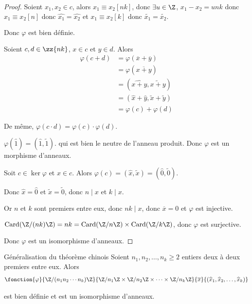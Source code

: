 \begin{proof}
    Soient $x_1, x_2 \in c$, alors $x_1 \equiv x_2 [nk]$, donc $\exists u \in \Z$, 
    $x_1 - x_2 = unk$ donc $x_1 \equiv x_2 [n]$ donc $\widehat{x_1} = \widehat{x_2}$ 
    et $x_1 \equiv x_2 [k]$ donc $\widetilde{x_1} = \widetilde{x_2}$.

    Donc $\varphi$ est bien définie.

    \avspace Soient $c, d \in \zz {nk}$, $x \in c$ et $y \in d$. Alors 
    \begin{align*}
        \varphi(c + d) & = \varphi(\overline x + \overline y) \\
        & = \varphi(\overline{x + y}) \\
        & = (\widehat{x + y}, \widetilde{x + y}) \\
        & = (\widehat x + \widehat y, \widetilde x + \widetilde y) \\
        & = \varphi(c) + \varphi(d)
    \end{align*}

    De même, $\varphi(c \cdot d) = \varphi(c) \cdot \varphi(d)$.

    $\varphi(\widehat 1) = (\widehat 1, \widetilde 1)$. qui est bien le neutre de l'anneau 
    produit. Donc $\varphi$ est un morphisme d'anneaux.

    \lvspace Soit $c \in \ker \varphi$ et $x \in c$. 
    Alors $\varphi(c) = (\widehat x, \widetilde x) = (\widehat 0, \widetilde 0)$.

    Donc $\widehat x = \widehat 0$ et $\widetilde x = \widetilde 0$, donc $n \mid x $ et $k \mid x$.

    Or $n$ et $k$ sont premiers entre eux, donc $nk \mid x$, donc $\overline x = 0$ et 
    $\varphi$ est injective.

    $\operatorname{Card}(\Z / (nk) \Z) = nk = \operatorname{Card}(\Z / n \Z) \times \operatorname{Card}(\Z / k \Z)$, donc
    $\varphi$ est surjective.

    Donc $\varphi$ est un isomorphisme d'anneaux.


\end{proof}

\begin{proposition}{Généralisation du théorème chinois}{}
    Soient $n_1, n_2, \ldots, n_k \geqslant 2$ entiers deux à deux premiers entre eux. 
    Alors $$\fonction{\varphi}{\Z / (n_1 n_2 \cdots n_k) \Z}{\Z / n_1 \Z \times \Z / n_2 \Z \times \cdots \times \Z / n_k \Z}{\overline x}{(\widehat x_1, \widehat x_2, \ldots, \widehat x_k)}$$

    est bien définie et est un isomorphisme d'anneaux.
\end{proposition}

